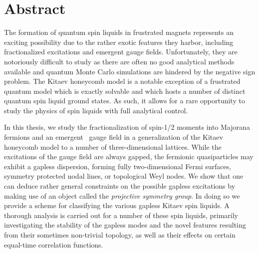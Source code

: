 \chapter*{Abstract}
%
%
The formation of quantum spin liquids in frustrated magnets represents an exciting possibility due to the rather exotic features they harbor, including fractionalized excitations and emergent gauge fields.
Unfortunately, they are notoriously difficult to study as there are often no good analytical methods available and quantum Monte Carlo simulations are hindered by the negative sign problem.
The Kitaev honeycomb model is a notable exception of a frustrated quantum model which is exactly solvable and which hosts a number of distinct quantum spin liquid ground states.
As such, it allows for a rare opportunity to study the physics of spin liquids with full analytical control.

In this thesis, we study the fractionalization of spin-1/2 moments into Majorana fermions and an emergent \ZZ~gauge field in a generalization of the Kitaev honeycomb model to a number of three-dimensional lattices.
While the excitations of the gauge field are always gapped, the fermionic quasiparticles may exhibit a gapless dispersion, forming fully two-dimensional Fermi surfaces, symmetry protected nodal lines, or topological Weyl nodes.
We show that one can deduce rather general constraints on the possible gapless excitations by making use of an object called the \textit{projective symmetry group}.
In doing so we provide a scheme for classifying the various gapless Kitaev spin liquids.
A thorough analysis is carried out for a number of these spin liquids, primarily investigating the stability of the gapless modes and the novel features resulting from their sometimes non-trivial topology, as well as their effects on certain equal-time correlation functions.